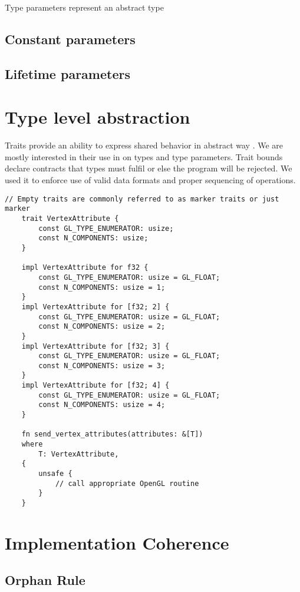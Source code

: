 Type parameters represent an abstract type 

\subsection{Constant parameters}


\subsection{Lifetime parameters}


\section{Type level abstraction}

Traits provide an ability to express shared behavior in abstract way \cite{rustbook}. We are mostly interested in their use in  on types and type parameters.
Trait bounds declare contracts that types must fulfil or else the program will be rejected. 
We used it to enforce use of valid data formats and proper sequencing of operations.

\begin{lstlisting}[Language=Rust]
    // Empty traits are commonly referred to as marker traits or just marker
    trait VertexAttribute {
        const GL_TYPE_ENUMERATOR: usize;
        const N_COMPONENTS: usize;
    }

    impl VertexAttribute for f32 { 
        const GL_TYPE_ENUMERATOR: usize = GL_FLOAT;
        const N_COMPONENTS: usize = 1;
    }
    impl VertexAttribute for [f32; 2] { 
        const GL_TYPE_ENUMERATOR: usize = GL_FLOAT;
        const N_COMPONENTS: usize = 2;
    }
    impl VertexAttribute for [f32; 3] { 
        const GL_TYPE_ENUMERATOR: usize = GL_FLOAT;
        const N_COMPONENTS: usize = 3;
    }
    impl VertexAttribute for [f32; 4] { 
        const GL_TYPE_ENUMERATOR: usize = GL_FLOAT;
        const N_COMPONENTS: usize = 4;
    }

    fn send_vertex_attributes(attributes: &[T])
    where
        T: VertexAttribute,
    {
        unsafe {
            // call appropriate OpenGL routine
        }
    }
\end{lstlisting}

\section{Implementation Coherence}

\subsection{Orphan Rule}